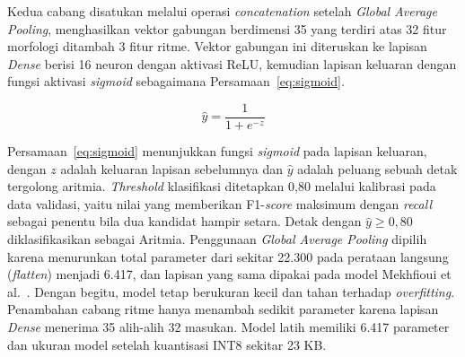 Kedua cabang disatukan melalui operasi \textit{concatenation} setelah
\textit{Global Average Pooling}, menghasilkan vektor gabungan berdimensi 35
yang terdiri atas 32 fitur morfologi ditambah 3 fitur ritme. Vektor gabungan
ini diteruskan ke lapisan \textit{Dense} berisi 16 neuron dengan aktivasi
ReLU, kemudian lapisan
keluaran dengan fungsi aktivasi \textit{sigmoid} sebagaimana
Persamaan~\ref{eq:sigmoid}.

\begin{equation}
\label{eq:sigmoid}
\hat{y} = \frac{1}{1+e^{-z}}
\end{equation}

Persamaan~\ref{eq:sigmoid} menunjukkan fungsi \textit{sigmoid} pada lapisan
keluaran, dengan $z$ adalah keluaran lapisan sebelumnya dan $\hat{y}$ adalah
peluang sebuah detak tergolong aritmia. \textit{Threshold} klasifikasi ditetapkan
0,80 melalui kalibrasi pada data validasi, yaitu nilai yang memberikan F1-\textit{score}
maksimum dengan \textit{recall} sebagai penentu bila dua kandidat hampir setara.
Detak dengan $\hat{y} \geq 0{,}80$ diklasifikasikan sebagai Aritmia.
Penggunaan \textit{Global Average Pooling} dipilih
karena menurunkan total parameter dari sekitar 22.300 pada perataan langsung
(\textit{flatten}) menjadi 6.417, dan lapisan yang sama dipakai pada model Mekhfioui
et al.~\cite{mekhfioui_2025}. Dengan begitu, model tetap berukuran kecil dan tahan terhadap
\textit{overfitting}. Penambahan cabang ritme hanya menambah sedikit
parameter karena lapisan \textit{Dense} menerima 35 alih-alih 32 masukan.
Model latih memiliki 6.417 parameter dan ukuran model setelah
kuantisasi INT8 sekitar 23 KB.

